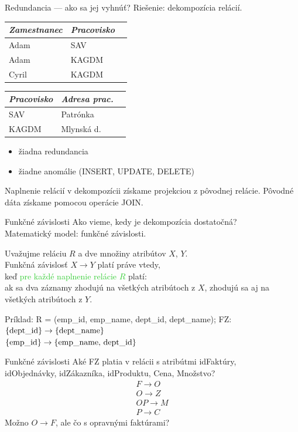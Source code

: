 \documentclass[12pt]{beamer}
\def\blue#1{\textcolor{Cerulean}{#1}}
\def\green#1{\textcolor{LimeGreen}{#1}}
\begin{document}
\begin{frame}[fragile]{Redundancia --- ako sa jej vyhnúť?}
Riešenie: dekompozícia relácií.

\bigskip
\begin{tabular}{|l|l|l|}
\hline
\emph{Zamestnanec} & \emph{Pracovisko} \\\hline
Adam & SAV \\\hline
Adam & KAGDM \\\hline
Cyril & KAGDM \\\hline
\end{tabular}
\begin{tabular}{|l|l|l|}
\hline
\emph{Pracovisko} & \emph{Adresa prac.} \\\hline
SAV & Patrónka \\\hline
KAGDM & Mlynská d. \\\hline
\end{tabular}
\bigskip

\begin{itemize}
\item žiadna redundancia
\item žiadne anomálie (INSERT, UPDATE, DELETE)
\end{itemize}

\bigskip
Naplnenie relácií v dekompozícii získame projekciou z pôvodnej relácie.
Pôvodné dáta získame pomocou operácie JOIN.
\end{frame}

\let\fz\rightarrow

\begin{frame}[fragile]{Funkčné závislosti}
Ako vieme, kedy je dekompozícia dostatočná?\\
Matematický model: funkčné závislosti.
\bigskip

Uvažujme reláciu $R$ a dve množiny atribútov $X$, $Y$.\\
\alert{Funkčná závislosť} $X\fz Y$ platí práve vtedy,\\
keď \green{pre každé naplnenie relácie $R$} platí:\\
\blue{ak sa dva záznamy zhodujú na všetkých atribútoch z $X$, zhodujú sa aj na všetkých atribútoch z $Y$}.
\bigskip

Príklad: R = (emp\_id, emp\_name, dept\_id, dept\_name); FZ:\\
$\{\hbox{dept\_id}\}\fz \{\hbox{dept\_name}\}$\\
$\{\hbox{emp\_id}\}\fz \{\hbox{emp\_name, dept\_id}\}$
\end{frame}

\begin{frame}[fragile]{Funkčné závislosti}
Aké FZ platia v relácii s atribútmi idFaktúry,\\
idObjednávky, idZákazníka, idProduktu, Cena, Množstvo?\\
\pause
\begin{eqnarray*}
F\fz O\\
O\fz Z\\
OP\fz M\\
P\fz C
\end{eqnarray*}
\pause
Možno $O\fz F$, ale čo s opravnými faktúrami?
\end{frame}
\end{document}
